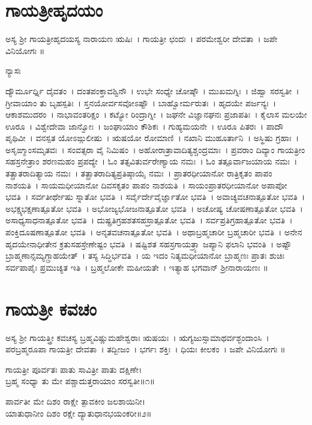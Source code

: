\newpage
\section{ಗಾಯತ್ರೀಹೃದಯಂ }
\thispagestyle{empty}
ಅಸ್ಯ ಶ್ರೀ ಗಾಯತ್ರೀಹೃದಯಸ್ಯ ನಾರಾಯಣ ಋಷಿಃ~। ಗಾಯತ್ರೀ ಛಂದಃ~। ಪರಮೇಶ್ವರೀ ದೇವತಾ~। ಜಪೇ ವಿನಿಯೋಗಃ ॥
\begin{center}ನ್ಯಾಸಃ\end{center}
ದ್ಯೌರ್ಮೂರ್ಧ್ನಿ ದೈವತಂ~। ದಂತಪಂಕ್ತಾವಶ್ವಿನೌ~। ಉಭೇ ಸಂಧ್ಯೇ ಚೋಷ್ಠೌ~। ಮುಖಮಗ್ನಿಃ~। ಜಿಹ್ವಾ ಸರಸ್ವತೀ~। ಗ್ರೀವಾಯಾಂ ತು ಬೃಹಸ್ಪತಿಃ~। ಸ್ತನಯೋರ್ವಸವೋಽಷ್ಟೌ~। ಬಾಹ್ವೋರ್ಮರುತಃ~। ಹೃದಯೇ ಪರ್ಜನ್ಯಃ~। ಆಕಾಶಮುದರಂ~। ನಾಭಾವಂತರಿಕ್ಷಂ~। ಕಟ್ಯೋ ರಿಂದ್ರಾಗ್ನೀ~। ಜಘನೇ ವಿಜ್ಞಾನಘನಃ ಪ್ರಜಾಪತಿಃ~। ಕೈಲಾಸ ಮಲಯೇ ಊರೂ~। ವಿಶ್ವೇದೇವಾ ಜಾನ್ವೋಃ~। ಜಂಘಾಯಾಂ ಕೌಶಿಕಃ~। ಗುಹ್ಯಮಯನೇ~। ಊರೂ ಪಿತರಃ~। ಪಾದೌ ಪೃಥಿವೀ~। ವನಸ್ಪತ ಯೋಽಙ್ಗುಲೀಷು~। ಋಷಯೋ ರೋಮಾಣಿ~। ನಖಾನಿ ಮುಹೂರ್ತಾನಿ~। ಅಸ್ಥಿಷು ಗ್ರಹಾಃ~। ಅಸೃಙ್ಮಾಂಸಮೃತವಃ~। ಸಂವತ್ಸರಾ ವೈ ನಿಮಿಷಂ~। ಅಹೋರಾತ್ರಾವಾದಿತ್ಯಶ್ಚಂದ್ರಮಾಃ~। ಪ್ರವರಾಂ ದಿವ್ಯಾಂ ಗಾಯತ್ರೀಂ ಸಹಸ್ರನೇತ್ರಾಂ ಶರಣಮಹಂ ಪ್ರಪದ್ಯೇ~। ಓಂ ತತ್ಸವಿತುರ್ವರೇಣ್ಯಾಯ ನಮಃ~। ಓಂ ತತ್ಪೂರ್ವಾಜಯಾಯ ನಮಃ~। ತತ್ಪ್ರಾತರಾದಿತ್ಯಾಯ ನಮಃ~। ತತ್ಪ್ರಾತರಾದಿತ್ಯಪ್ರತಿಷ್ಠಾಯೈ ನಮಃ~। ಪ್ರಾತರಧೀಯಾನೋ ರಾತ್ರಿಕೃತಂ ಪಾಪಂ ನಾಶಯತಿ~। ಸಾಯಮಧೀಯಾನೋ ದಿವಸಕೃತಂ ಪಾಪಂ ನಾಶಯತಿ~। ಸಾಯಂಪ್ರಾತರಧೀಯಾನೋ ಅಪಾಪೋ ಭವತಿ~। ಸರ್ವತೀರ್ಥೇಷು ಸ್ನಾತೋ ಭವತಿ~। ಸರ್ವೈರ್ದೇವೈರ್ಜ್ಞಾತೋ ಭವತಿ~। ಅವಾಚ್ಯವಚನಾತ್ಪೂತೋ ಭವತಿ~। ಅಭಕ್ಷ್ಯಭಕ್ಷಣಾತ್ಪೂತೋ ಭವತಿ~। ಅಭೋಜ್ಯಭೋಜನಾತ್ಪೂತೋ ಭವತಿ~। ಅಚೋಷ್ಯ ಚೋಷಣಾತ್ಪೂತೋ ಭವತಿ~। ಅಸಾಧ್ಯಸಾಧನಾತ್ಪೂತೋ ಭವತಿ~। ದುಷ್ಪ್ರತಿಗ್ರಹಶತಸಹಸ್ರಾತ್ಪೂತೋ ಭವತಿ~। ಸರ್ವಪ್ರತಿಗ್ರಹಾತ್ಪೂತೋ ಭವತಿ~। ಪಂಕ್ತಿದೂಷಣಾತ್ಪೂತೋ ಭವತಿ~। ಅನೃತವಚನಾತ್ಪೂತೋ ಭವತಿ~। ಅಥಾಬ್ರಹ್ಮಚಾರೀ ಬ್ರಹ್ಮಚಾರೀ ಭವತಿ~। ಅನೇನ ಹೃದಯೇನಾಧೀತೇನ ಕ್ರತುಸಹಸ್ರೇಣೇಷ್ಟಂ ಭವತಿ~। ಷಷ್ಟಿಶತ ಸಹಸ್ರಗಾಯತ್ರ್ಯಾ ಜಪ್ಯಾನಿ ಫಲಾನಿ ಭವಂತಿ~। ಅಷ್ಟೌ ಬ್ರಾಹ್ಮಣಾನ್ಸಮ್ಯಗ್ಗ್ರಾಹಯೇತ್~। ತಸ್ಯ ಸಿದ್ಧಿರ್ಭವತಿ~। ಯ ಇದಂ ನಿತ್ಯಮಧೀಯಾನೋ ಬ್ರಾಹ್ಮಣಃ ಪ್ರಾತಃ ಶುಚಿಃ ಸರ್ವಪಾಪೈಃ ಪ್ರಮುಚ್ಯತ ಇತಿ~। ಬ್ರಹ್ಮಲೋಕೇ ಮಹೀಯತೇ~। ಇತ್ಯಾಹ ಭಗವಾನ್ ಶ್ರೀನಾರಾಯಣಃ ॥
\section{ಗಾಯತ್ರೀ ಕವಚಂ}
ಅಸ್ಯ ಶ್ರೀ ಗಾಯತ್ತ್ರೀ ಕವಚಸ್ಯ ಬ್ರಹ್ಮವಿಷ್ಣುಮಹೇಶ್ವರಾಃ ಋಷಯಃ~। ಋಗ್ಯಜುಸ್ಸಾಮಾಥರ್ವಶ್ಛಂದಾಂಸಿ~। ಪರಬ್ರಹ್ಮರೂಪಾ ಗಾಯತ್ರೀ ದೇವತಾ~। ತದ್ಬೀಜಂ~। ಭರ್ಗಃ ಶಕ್ತಿಃ~। ಧಿಯಃ ಕೀಲಕಂ~। ಜಪೇ ವಿನಿಯೋಗಃ ॥

ಗಾಯತ್ರೀ ಪೂರ್ವತಃ ಪಾತು ಸಾವಿತ್ರೀ ಪಾತು ದಕ್ಷಿಣೇ।\\
ಬ್ರಹ್ಮ ಸಂಧ್ಯಾ ತು ಮೇ ಪಶ್ಚಾದುತ್ತರಾಯಾಂ ಸರಸ್ವತೀ॥೧॥

ಪಾರ್ವತೀ ಮೇ ದಿಶಂ ರಾಕ್ಷೇ ತ್ಪಾವಕೀಂ ಜಲಶಾಯಿನೀ।\\
ಯಾತುಧಾನೀಂ ದಿಶಂ ರಕ್ಷೇ ದ್ಯಾತುಧಾನಭಯಂಕರೀ॥೨॥

